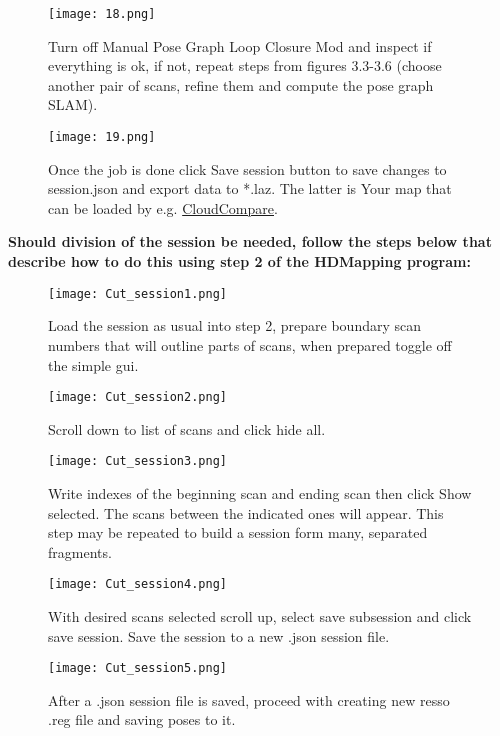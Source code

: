 \begin{figure}[H]
	\centering
	\texttt{[image: 18.png]}
	\caption{Turn off Manual Pose Graph Loop Closure Mod and inspect if everything is ok, if not,  repeat steps from figures 3.3-3.6 (choose another pair of scans, refine them and compute the pose graph SLAM).}
	\label{fig:18}
\end{figure}

\begin{figure}[H]
	\centering
	\texttt{[image: 19.png]}
	\caption{Once the job is done click Save session button to save changes to session.json and export data to *.laz. The latter is Your map that can be loaded by e.g. \href{https://www.cloudcompare.org/}{CloudCompare}.}
	\label{fig:19}
\end{figure}
\pagebreak
{\large \textbf{Should division of the session be needed, follow the steps below that describe how to do this using step 2 of the HDMapping program:}}
\begin{figure}[H]
	\centering
	\texttt{[image: Cut\_session1.png]}
	\caption{Load the session as usual into step 2, prepare boundary scan numbers that will outline parts of scans, when prepared toggle off the simple gui.}
	\label{fig:20}
\end{figure}

\begin{figure}[H]
	\centering
	\texttt{[image: Cut\_session2.png]}
	\caption{Scroll down to list of scans and click hide all.}
	\label{fig:21}
\end{figure}

\begin{figure}[H]
	\centering
	\texttt{[image: Cut\_session3.png]}
	\caption{Write indexes of the beginning scan and ending scan then click Show selected. The scans between the indicated ones will appear. This step may be repeated to build a session form many, separated fragments.}
	\label{fig:22}
\end{figure}

\begin{figure}[H]
	\centering
	\texttt{[image: Cut\_session4.png]}
	\caption{With desired scans selected scroll up, select save subsession and click save session. Save the session to a new .json session file.}
	\label{fig:23}
\end{figure}

\begin{figure}[H]
	\centering
	\texttt{[image: Cut\_session5.png]}
	\caption{After a .json session file is saved, proceed with creating new resso .reg file and saving poses to it.}
	\label{fig:24}
\end{figure}

